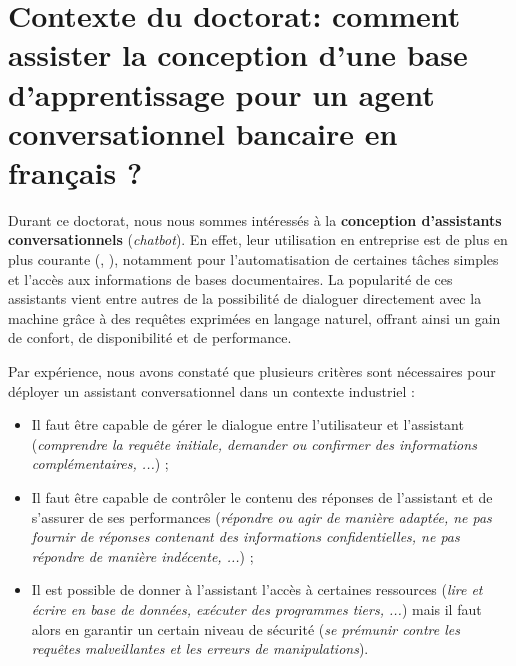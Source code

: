 \section[
	Contexte du doctorat: comment assister la conception d'une base d'apprentissage ?
]{
	Contexte du doctorat: comment assister la conception d'une base d'apprentissage pour un agent conversationnel bancaire en français ?
}
\label{section:2.4-CONTEXTE-DOCTORAT}

	Durant ce doctorat, nous nous sommes intéressés à la \textbf{conception d'assistants conversationnels} (\textit{chatbot}).
	En effet, leur utilisation en entreprise est de plus en plus courante (\cite{goasduff:2019:chatbots-will-appeal}, \cite{costello-lodolce:2022:gartner-predicts-chatbots}), notamment pour l'automatisation de certaines tâches simples et l'accès aux informations de bases documentaires.
	La popularité de ces assistants vient entre autres de la possibilité de dialoguer directement avec la machine grâce à des requêtes exprimées en langage naturel, offrant ainsi un gain de confort, de disponibilité et de performance.
	
	Par expérience, nous avons constaté que plusieurs critères sont nécessaires pour déployer un assistant conversationnel dans un contexte industriel :
	\begin{itemize}
		\item Il faut être capable de gérer le dialogue entre l'utilisateur et l'assistant (\textit{comprendre la requête initiale, demander ou confirmer des informations complémentaires, ...}) ;
		\item Il faut être capable de contrôler le contenu des réponses de l'assistant et de s'assurer de ses performances (\textit{répondre ou agir de manière adaptée, ne pas fournir de réponses contenant des informations confidentielles, ne pas répondre de manière indécente, ...}) ;
		\item Il est possible de donner à l'assistant l'accès à certaines ressources (\textit{lire et écrire en base de données, exécuter des programmes tiers, ...}) mais il faut alors en garantir un certain niveau de sécurité (\textit{se prémunir contre les requêtes malveillantes et les erreurs de manipulations}).
	\end{itemize}
	
